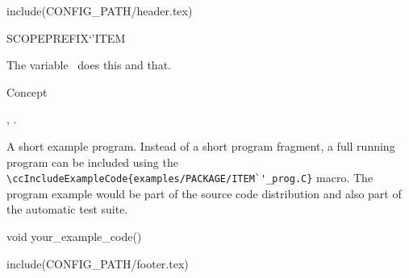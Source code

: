 include(CONFIG_PATH/header.tex)
\begin{ccRefVariable}SCOPE{PREFIX`'ITEM}  %


\ccDefinition
  
The variable \ccRefName\ does this and that.



\ccIsModel

Concept

\ccSeeAlso

,
.

\ccExample

A short example program.
Instead of a short program fragment, a full running program can be
included using the 
\verb|\ccIncludeExampleCode{examples/PACKAGE/ITEM`'_prog.C}| 
macro. The program example would be part of the source code distribution and
also part of the automatic test suite.

\begin{ccExampleCode}
void your_example_code() {
}
\end{ccExampleCode}


\end{ccRefVariable}

include(CONFIG_PATH/footer.tex)

